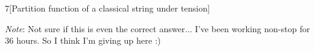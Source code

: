 \documentclass[12pt]{article}
\begin{document}
\begin{problem}{7}[Partition function of a classical string under tension]
\begin{solution}
\textit{Note}: Not sure if this is even the correct answer... I've been working
non-stop for 36 hours. So I think I'm giving up here :)

\end{solution}


\end{problem}
\newpage
    
\end{document}
